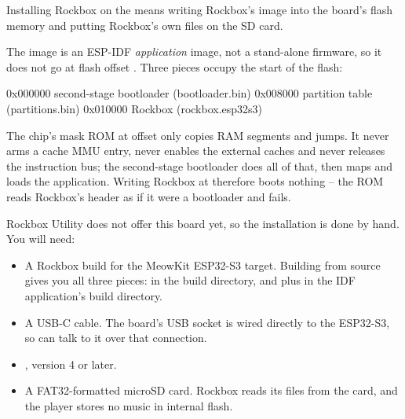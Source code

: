 Installing Rockbox on the \dap{} means writing Rockbox's image into the board's
flash memory and putting Rockbox's own files on the SD card.

The image is an ESP-IDF \emph{application} image, not a stand-alone firmware, so it
does not go at flash offset . Three pieces occupy the start of the flash:

\begin{code}
    0x000000   second-stage bootloader   (bootloader.bin)
    0x008000   partition table           (partitions.bin)
    0x010000   Rockbox                   (rockbox.esp32s3)
\end{code}

The chip's mask ROM at offset  only copies RAM segments and jumps. It never
arms a cache MMU entry, never enables the external caches and never releases the
instruction bus; the second-stage bootloader does all of that, then maps and loads the
application. Writing Rockbox at  therefore boots nothing -- the ROM reads
Rockbox's header as if it were a bootloader and fails.

Rockbox Utility does not offer this board yet, so the installation is done by hand. You
will need:

\begin{itemize}
  \item A Rockbox build for the MeowKit ESP32-S3 target. Building from source gives you
    all three pieces:  in the build directory, and
     plus  in the IDF application's build
    directory.
  \item A USB-C cable. The board's USB socket is wired directly to the ESP32-S3, so
     can talk to it over that connection.
  \item {}, version 4 or later.
  \item A FAT32-formatted microSD card. Rockbox reads its files from the card, and the
    player stores no music in internal flash.
\end{itemize}

